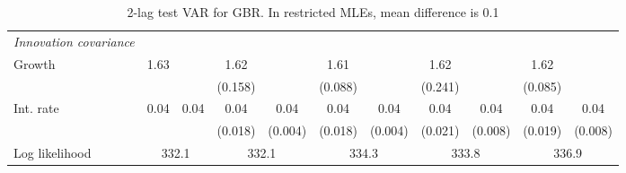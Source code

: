 \begin{table}[htbp]
\begin{tabular}{@{\extracolsep{4pt}}lcccccccccc@{}}
\rule{0pt}{4ex} \emph{Innovation covariance}  	 & 	 & 	 & 	 & 	 & 	 & 	 & 	 & 	 & 	 &\\ 
\quad Growth 	 &1.63 	 &  	 & 1.62 	 &  	 & 1.61 	 &  	 & 1.62 	 &  	 & 1.62 	 & 	 \\ 
 		 &  	 &  	 & (0.158) 	 &  	 & (0.088) 	 &  	 & (0.241) 	 &  	 & (0.085) 	 &  	 \\ 
\quad Int. rate 	 &0.04 	 & 0.04 	 & 0.04 	 & 0.04 	 & 0.04 	 & 0.04 	 & 0.04 	 & 0.04 	 & 0.04 	 & 0.04	 \\ 
 		 &  	 &  	 & (0.018) 	 & (0.004) 	 & (0.018) 	 & (0.004) 	 & (0.021) 	 & (0.008) 	 & (0.019) 	 & (0.008) 	 \\ 
 \hline \rule{0pt}{4ex} 
  Log likelihood 	 &\multicolumn{2}{c}{332.1} 	 & \multicolumn{2}{c}{332.1} 	 & \multicolumn{2}{c}{334.3} 	 & \multicolumn{2}{c}{333.8} 	 & \multicolumn{2}{c}{336.9}\\ 

 \hline 	\end{tabular}		\caption{2-lag test VAR for GBR. In restricted MLEs, mean difference is 0.1}
		\label{tab:GBR2lag}

\end{table}